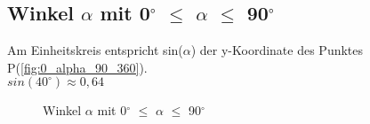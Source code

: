 \documentclass{standalone}
\begin{document}
\subsection{Winkel $\alpha$ mit 0$^\circ$  $\leq$ $\alpha$ $\leq$ 90$^\circ$ }
Am Einheitskreis entspricht sin($\alpha$) der y-Koordinate des Punktes P(\autoref{fig:0_alpha_90_360}).\\
\textbf{$sin(40^\circ ) \approx 0,64$}

\begin{figure}[hb!]
  \center
  \def\svgwidth{200px}
  
  \caption{Winkel $\alpha$ mit 0$^\circ$  $\leq$ $\alpha$ $\leq$ 90$^\circ$ }
  \label{fig:0_alpha_90_360}
\end{figure}
\end{document}
